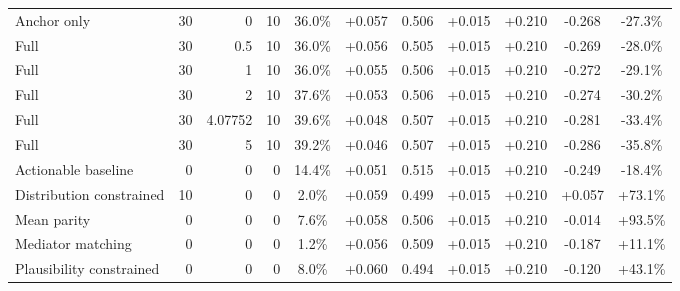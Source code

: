 \begin{table}[htbp]
\begin{tabular}{lrrrccccccc}
Anchor only & 30 & 0 & 10 & 36.0\% & +0.057 & 0.506 & +0.015 & +0.210 & -0.268 & -27.3\% \\
Full & 30 & 0.5 & 10 & 36.0\% & +0.056 & 0.505 & +0.015 & +0.210 & -0.269 & -28.0\% \\
Full & 30 & 1 & 10 & 36.0\% & +0.055 & 0.506 & +0.015 & +0.210 & -0.272 & -29.1\% \\
Full & 30 & 2 & 10 & 37.6\% & +0.053 & 0.506 & +0.015 & +0.210 & -0.274 & -30.2\% \\
Full & 30 & 4.07752 & 10 & 39.6\% & +0.048 & 0.507 & +0.015 & +0.210 & -0.281 & -33.4\% \\
Full & 30 & 5 & 10 & 39.2\% & +0.046 & 0.507 & +0.015 & +0.210 & -0.286 & -35.8\% \\
Actionable baseline & 0 & 0 & 0 & 14.4\% & +0.051 & 0.515 & +0.015 & +0.210 & -0.249 & -18.4\% \\
Distribution constrained & 10 & 0 & 0 & 2.0\% & +0.059 & 0.499 & +0.015 & +0.210 & +0.057 & +73.1\% \\
Mean parity & 0 & 0 & 0 & 7.6\% & +0.058 & 0.506 & +0.015 & +0.210 & -0.014 & +93.5\% \\
Mediator matching & 0 & 0 & 0 & 1.2\% & +0.056 & 0.509 & +0.015 & +0.210 & -0.187 & +11.1\% \\
Plausibility constrained & 0 & 0 & 0 & 8.0\% & +0.060 & 0.494 & +0.015 & +0.210 & -0.120 & +43.1\% \\
\bottomrule
\end{tabular}
\end{table}